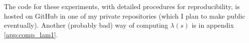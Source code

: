 The code for these experiments, with detailed procedures for reproducibility,
is hosted on GitHub in one of my private repositories (which I plan to make public
eventually).
Another (probably bad) way of computing $\lambda(s)$ is in appendix \ref{app:comp_lam1}. 



 









